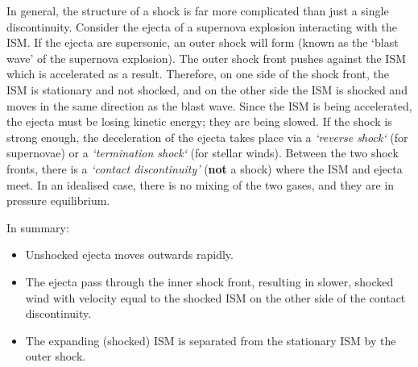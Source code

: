%
\par 
In general, the structure of a shock is far more complicated than just a single discontinuity.
 Consider the ejecta of a supernova explosion interacting with the ISM.
 If the ejecta are supersonic, an outer shock will form (known as the `blast wave' of the supernova explosion).
 The outer shock front pushes against the ISM which is accelerated as a result.
 Therefore, on one side of the shock front, the ISM is stationary and not shocked, and on the other side the ISM is shocked and moves in the same direction as the blast wave.
 Since the ISM is being accelerated, the ejecta must be losing kinetic energy; they are being slowed.
 If the shock is strong enough, the deceleration of the ejecta takes place via a \emph{`reverse shock`} (for supernovae) or a \emph{`termination shock`} (for stellar winds).
 Between the two shock fronts, there is a \emph{`contact discontinuity'} (\textbf{not} a shock) where the ISM and ejecta meet.
 In an idealised case, there is no mixing of the two gases, and they are in pressure equilibrium.
\par 
In summary:
%
\begin{itemize}
	\item Unshocked ejecta moves outwards rapidly.
	\item The ejecta pass through the inner shock front, resulting in slower, shocked wind with velocity equal to the shocked ISM on the other side of the contact discontinuity.
	\item The expanding (shocked) ISM is separated from the stationary ISM by the outer shock.
\end{itemize}
%
